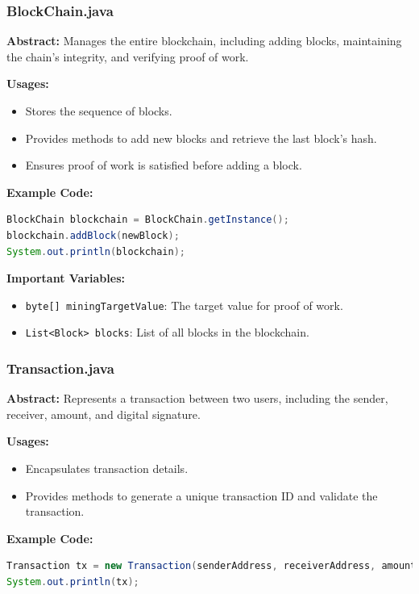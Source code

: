 \documentclass[12pt]{article}
\begin{document}
\subsubsection{BlockChain.java}
\textbf{Abstract:} Manages the entire blockchain, including adding blocks, maintaining the chain's integrity, and verifying proof of work.

\textbf{Usages:}
\begin{itemize}
    \item Stores the sequence of blocks.
    \item Provides methods to add new blocks and retrieve the last block's hash.
    \item Ensures proof of work is satisfied before adding a block.
\end{itemize}

\textbf{Example Code:}
\begin{lstlisting}[language=Java]
BlockChain blockchain = BlockChain.getInstance();
blockchain.addBlock(newBlock);
System.out.println(blockchain);
\end{lstlisting}

\textbf{Important Variables:}
\begin{itemize}
    \item \texttt{byte[] miningTargetValue}: The target value for proof of work.
    \item \texttt{List<Block> blocks}: List of all blocks in the blockchain.
\end{itemize}

\subsubsection{Transaction.java}
\textbf{Abstract:} Represents a transaction between two users, including the sender, receiver, amount, and digital signature.

\textbf{Usages:}
\begin{itemize}
    \item Encapsulates transaction details.
    \item Provides methods to generate a unique transaction ID and validate the transaction.
\end{itemize}

\textbf{Example Code:}
\begin{lstlisting}[language=Java]
Transaction tx = new Transaction(senderAddress, receiverAddress, amount, signature);
System.out.println(tx);
\end{lstlisting}
\end{document}
